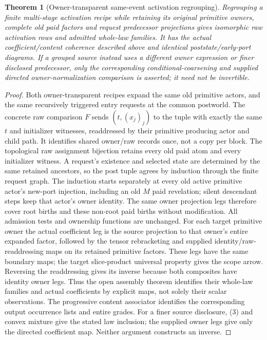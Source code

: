 \documentclass[11pt]{article}
\newtheorem{theorem}{Theorem}\newtheorem{proposition}{Proposition}
\begin{document}
\begin{theorem}[Owner-transparent same-event activation regrouping]
Regrouping a finite multi-stage activation recipe while retaining its original primitive owners, complete old paid factors and request predecessor projections gives isomorphic raw activation rows and admitted whole-law families. It has the actual coefficient/content coherence described above and identical poststate/early-port diagrams. If a grouped source instead uses a different owner expression or finer disclosed predecessor, only the corresponding conditional-coarsening and supplied directed owner-normalization comparison is asserted; it need not be invertible.
\end{theorem}
\begin{proof}
Both owner-transparent recipes expand the same old primitive actors, and the same recursively triggered entry requests at the common postworld. The concrete raw comparison $F$ sends $(t,(x_j)_j)$ to the tuple with exactly the same $t$ and initializer witnesses, readdressed by their primitive producing actor and child path. It identifies shared owner/raw records once, not a copy per block. The topological raw assignment bijection retains every old paid atom and every initializer witness. A request's existence and selected state are determined by the same retained ancestors, so the post tuple agrees by induction through the finite request graph. The induction starts separately at every old active primitive actor's new-port injection, including an old $M$ paid revelation; silent descendant steps keep that actor's owner identity. The same owner projection legs therefore cover root births and these non-root paid births without modification. All admission tests and ownership functions are unchanged. For each target primitive owner the actual coefficient leg is the source projection to that owner's entire expanded factor, followed by the tensor rebracketing and supplied identity/raw-readdressing maps on its retained primitive factors. These legs have the same boundary maps; the target slice-product universal property gives the scope arrow. Reversing the readdressing gives its inverse because both composites have identity owner legs. Thus the open assembly theorem identifies their whole-law families and actual coefficients by explicit maps, not solely their scalar observations. The progressive content associator identifies the corresponding output occurrence lists and entire grades. For a finer source disclosure, (3) and convex mixture give the stated law inclusion; the supplied owner legs give only the directed coefficient map. Neither argument constructs an inverse.\end{proof}
\end{document}
